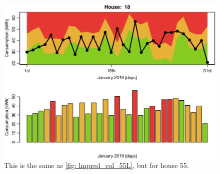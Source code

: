 \begin{figure}
    \centering
    \includegraphics[width=.8\textwidth]{../../../figures/Kplot18.eps}
    \caption{This is the same as \cref{fig: lmpred_col_55L}, but for house 55.}
    \label{fig: lmpred_col_18L}
\end{figure}
